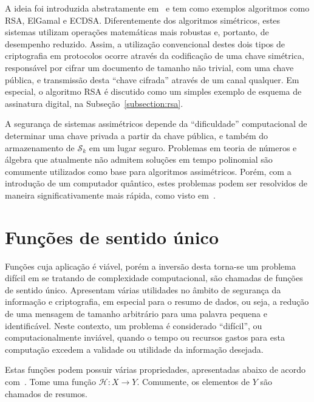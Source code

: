 \documentclass{ufsctex/ufsctex}
\newcommand{\sk}{\mathcal{S}_{k}}
\begin{document}
A ideia foi introduzida abstratamente em~\cite{Diffie:article:1976:sep} e tem
como exemplos algoritmos como RSA, ElGamal e ECDSA. Diferentemente dos algoritmos simétricos,
estes sistemas utilizam operações matemáticas mais robustas e, portanto, de
desempenho reduzido. Assim, a utilização convencional destes dois tipos de
criptografia em protocolos ocorre através da codificação de uma chave
simétrica, responsável por cifrar um documento de tamanho não trivial, com uma
chave pública, e transmissão desta ``chave cifrada'' através de um canal
qualquer. Em especial, o algoritmo RSA é discutido como um simples exemplo de
esquema de assinatura digital, na Subseção~\ref{subsection:rsa}.

A segurança de sistemas assimétricos depende da ``dificuldade'' computacional
de determinar uma chave privada a partir da chave pública, e também do
armazenamento de $\sk{}$ em um lugar seguro. Problemas em teoria de números e
álgebra que atualmente não admitem soluções em tempo polinomial são comumente
utilizados como base para algoritmos assimétricos. Porém, com a introdução de
um computador quântico, estes problemas podem ser resolvidos de maneira
significativamente mais rápida, como visto em~\cite{Shor:article:1997:oct}.

\section{Funções de sentido único}\label{section:hashfunc}

Funções cuja aplicação é viável, porém a inversão desta torna-se um problema
difícil em se tratando de complexidade computacional, são chamadas de funções
de sentido único. Apresentam várias utilidades no âmbito de segurança da
informação e criptografia, em especial para o resumo de dados, ou seja, a
redução de uma mensagem de tamanho arbitrário para uma palavra pequena e
identificável. Neste contexto, um problema é considerado ``difícil'', ou
computacionalmente inviável, quando o tempo ou recursos gastos para esta
computação excedem a validade ou utilidade da informação desejada.

Estas funções podem possuir várias propriedades, apresentadas
abaixo de acordo com~\cite[Seção 9.2]{Menezes:book:1996}. Tome uma função
$\mathcal{H} : X \longrightarrow Y$.  Comumente, os elementos de $Y$ são
chamados de resumos.
\end{document}
